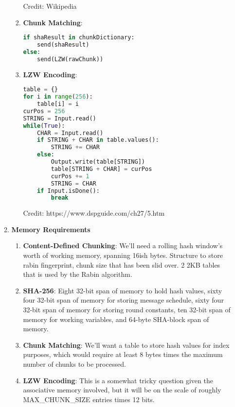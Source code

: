 \documentclass{article}
\begin{document}
\begin{enumerate}
\begin{enumerate}[label=(\alph*)]
\begin{enumerate}[label=(\roman*)]
\begin{lstlisting}[language=python]
\end{lstlisting}
Credit: Wikipedia
\item%
\textbf{Chunk Matching}:
\begin{lstlisting}[language=python]
if shaResult in chunkDictionary:
    send(shaResult)
else:
    send(LZW(rawChunk))
\end{lstlisting}
\item%
\textbf{LZW Encoding}:
\begin{lstlisting}[language=python]
table = {}
for i in range(256):
    table[i] = i
curPos = 256
STRING = Input.read()
while(True):
    CHAR = Input.read()
    if STRING + CHAR in table.values():
        STRING += CHAR
    else:
        Output.write(table[STRING])
        table[STRING + CHAR] = curPos
        curPos += 1
        STRING = CHAR
    if Input.isDone():
        break
\end{lstlisting}
Credit: https://www.dspguide.com/ch27/5.htm
\end{enumerate}%
\item%
\textbf{Memory Requirements}
\begin{enumerate}[label=(\roman*)]
\item%
\textbf{Content-Defined Chunking}:\newline
We'll need a rolling hash window's worth of working memory, spanning 16ish bytes.
Structure to store rabin fingerprint, chunk size that has been slid over.
2 2KB tables that is used by the Rabin algorithm.
\item%
\textbf{SHA-256}:\newline
Eight 32-bit span of memory to hold hash values, 
sixty four 32-bit span of memory for storing message schedule,
sixty four 32-bit span of memory for storing round constants,
ten 32-bit span of memory for working variables, and
64-byte SHA-block span of memory.

\item%
\textbf{Chunk Matching}:\newline
We'll want a table to store hash values for index purposes, which would require at least 8 bytes times the maximum number of chunks to be processed.

\item%
\textbf{LZW Encoding}:\newline
This is a somewhat tricky question given the associative memory involved, but it will be on the scale of roughly MAX\_CHUNK\_SIZE entries times 12 bits.

\end{enumerate}%


\end{enumerate}
\end{enumerate}
\end{document}
